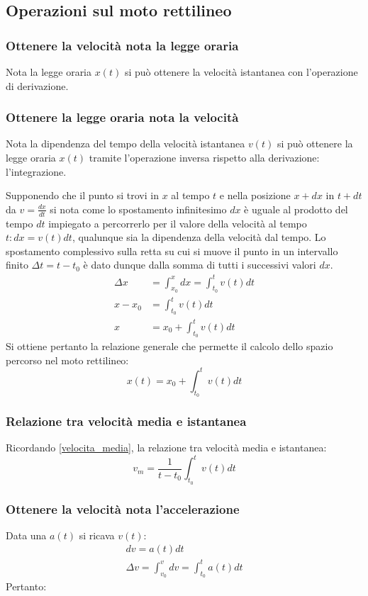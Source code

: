 \documentclass[class=book, crop=false, oneside, 12pt]{standalone}
\begin{document}
  \subsection{Operazioni sul moto rettilineo}
    \subsubsection{Ottenere la velocit\`a nota la legge oraria}
    Nota la legge oraria $x(t)$ si pu\`o ottenere la velocit\`a istantanea con l'operazione di derivazione.
    \subsubsection{Ottenere la legge oraria nota la velocit\`a}
		Nota la dipendenza del tempo della velocit\`a istantanea $v(t)$ si pu\`o ottenere la legge oraria $x(t)$ tramite l'operazione inversa rispetto alla derivazione: l'integrazione.

		Supponendo che il punto si trovi in $x$ al tempo $t$ e nella posizione $x+dx$ in $t+dt$ da $v=\frac{dx}{dt}$ si nota come lo spostamento infinitesimo $dx$ \`e uguale al prodotto del tempo $dt$ impiegato a percorrerlo per il valore della velocit\`a al tempo $t:dx=v(t)dt$, qualunque sia la dipendenza della velocit\`a dal tempo.
		Lo spostamento complessivo sulla retta su cui si muove il punto in un intervallo finito $\Delta t = t - t_0$ \`e dato dunque dalla somma di tutti i successivi valori $dx$.
		\begin{align*}
			\Delta x &= \int_{x_0}^x dx = \int_{t_0}^t v(t)dt\\
			 x - x_0 &= \int_{t_0}^t v(t)dt\\
			       x &= x_0 +\int_{t_0}^tv(t)dt
		\end{align*}
		Si ottiene pertanto la relazione generale che permette il calcolo dello spazio percorso nel moto rettilineo:
		\begin{equation}
			x(t) = x_0 + \int_{t_0}^t v(t)dt
		\end{equation}

		\subsubsection{Relazione tra velocit\`a media e istantanea}
		Ricordando \eqref{velocita_media}, la relazione tra velocit\`a media e istantanea:
		\begin{equation*}
			v_m = \dfrac{1}{t-t_0}\int_{t_0}^{t}v(t)dt
		\end{equation*}
		\subsubsection{Ottenere la velocit\`a nota l'accelerazione}
		Data una $a(t)$ si ricava $v(t)$:
		\begin{gather*}
			dv = a(t)dt\\
			\Delta v = \int_{v_0}^v dv =\int_{t_0}^t a(t)dt
		\end{gather*}
		Pertanto:
\end{document}
